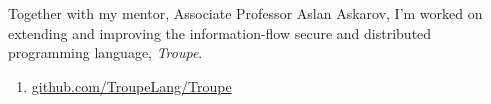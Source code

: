 
Together with my mentor, Associate Professor Aslan Askarov, I'm worked on extending and improving
the information-flow secure and distributed programming language, \emph{Troupe}.

\medskip

\begin{enumerate}[leftmargin=2.5em]
\item[\indent\faGit] \href{https://github.com/TroupeLang/Troupe}{github.com/TroupeLang/Troupe}
\end{enumerate}

\medskip